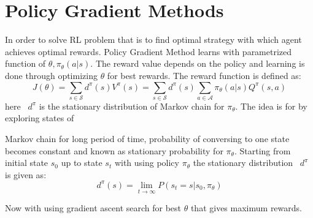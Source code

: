 \section{Policy Gradient Methods}
In order to solve RL problem that is to find optimal strategy with which agent achieves optimal rewards. Policy Gradient Method learns with parametrized function of $\displaystyle \theta ,\pi _{\theta } (a|s)$. The reward value depends on the policy and learning is done through optimizing $\displaystyle \theta $ for best rewards. The reward function is defined as:
\begin{equation}
J(\theta )=\sum _{s\in \mathcal{S}} d^{\pi } (s)V^{\pi } (s)=\sum _{s\in \mathcal{S}} d^{\pi } (s)\sum _{a\in \mathcal{A}} \pi _{\theta } (a|s)Q^{\pi } (s,a)
\end{equation}
here \ $\displaystyle d^{\pi }$ is the stationary distribution of Markov chain for $\displaystyle \pi _{\theta }$. The idea is for by exploring states of

Markov chain for long period of time, probability of conversing to one state becomes constant and known as stationary probability for $\displaystyle \pi _{\theta }$. Starting from initial state $\displaystyle s_{0}$ up to state $\displaystyle s_{t}$ with using policy $\displaystyle \pi _{\theta }$ the stationary distribution \ $\displaystyle d^{\pi }$ is given as:
\begin{equation}
d^{\pi } (s)=\lim _{t\rightarrow \infty } P(s_{t} =s|s_{0} ,\pi _{\theta } )
\end{equation}


Now with using gradient ascent search for best $\displaystyle \theta $ that gives maximum rewards.

